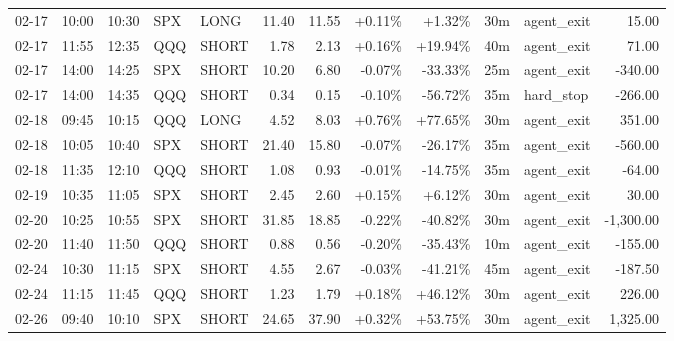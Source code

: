 \documentclass[11pt,a4paper,twoside]{article}
\begin{document}
\begin{center}
\begin{longtable}{>{\color{txtmain}}l l l l l r r r r r >{\color{txtmain}}l r}
02-17 & 10:00 & 10:30 & SPX & LONG & 11.40 & 11.55 & \textcolor{wingreen}{+0.11\%} & \textcolor{wingreen}{+1.32\%} & 30m & agent\_exit & \textcolor{wingreen}{15.00} \\
02-17 & 11:55 & 12:35 & QQQ & SHORT & 1.78 & 2.13 & \textcolor{wingreen}{+0.16\%} & \textcolor{wingreen}{+19.94\%} & 40m & agent\_exit & \textcolor{wingreen}{71.00} \\
02-17 & 14:00 & 14:25 & SPX & SHORT & 10.20 & 6.80 & \textcolor{lossred}{-0.07\%} & \textcolor{lossred}{-33.33\%} & 25m & agent\_exit & \textcolor{lossred}{-340.00} \\
02-17 & 14:00 & 14:35 & QQQ & SHORT & 0.34 & 0.15 & \textcolor{lossred}{-0.10\%} & \textcolor{lossred}{-56.72\%} & 35m & hard\_stop & \textcolor{lossred}{-266.00} \\
02-18 & 09:45 & 10:15 & QQQ & LONG & 4.52 & 8.03 & \textcolor{wingreen}{+0.76\%} & \textcolor{wingreen}{+77.65\%} & 30m & agent\_exit & \textcolor{wingreen}{351.00} \\
02-18 & 10:05 & 10:40 & SPX & SHORT & 21.40 & 15.80 & \textcolor{lossred}{-0.07\%} & \textcolor{lossred}{-26.17\%} & 35m & agent\_exit & \textcolor{lossred}{-560.00} \\
02-18 & 11:35 & 12:10 & QQQ & SHORT & 1.08 & 0.93 & \textcolor{lossred}{-0.01\%} & \textcolor{lossred}{-14.75\%} & 35m & agent\_exit & \textcolor{lossred}{-64.00} \\
02-19 & 10:35 & 11:05 & SPX & SHORT & 2.45 & 2.60 & \textcolor{wingreen}{+0.15\%} & \textcolor{wingreen}{+6.12\%} & 30m & agent\_exit & \textcolor{wingreen}{30.00} \\
02-20 & 10:25 & 10:55 & SPX & SHORT & 31.85 & 18.85 & \textcolor{lossred}{-0.22\%} & \textcolor{lossred}{-40.82\%} & 30m & agent\_exit & \textcolor{lossred}{-1,300.00} \\
02-20 & 11:40 & 11:50 & QQQ & SHORT & 0.88 & 0.56 & \textcolor{lossred}{-0.20\%} & \textcolor{lossred}{-35.43\%} & 10m & agent\_exit & \textcolor{lossred}{-155.00} \\
02-24 & 10:30 & 11:15 & SPX & SHORT & 4.55 & 2.67 & \textcolor{lossred}{-0.03\%} & \textcolor{lossred}{-41.21\%} & 45m & agent\_exit & \textcolor{lossred}{-187.50} \\
02-24 & 11:15 & 11:45 & QQQ & SHORT & 1.23 & 1.79 & \textcolor{wingreen}{+0.18\%} & \textcolor{wingreen}{+46.12\%} & 30m & agent\_exit & \textcolor{wingreen}{226.00} \\
02-26 & 09:40 & 10:10 & SPX & SHORT & 24.65 & 37.90 & \textcolor{wingreen}{+0.32\%} & \textcolor{wingreen}{+53.75\%} & 30m & agent\_exit & \textcolor{wingreen}{1,325.00} \\

\end{longtable}
\end{center}
\end{document}
